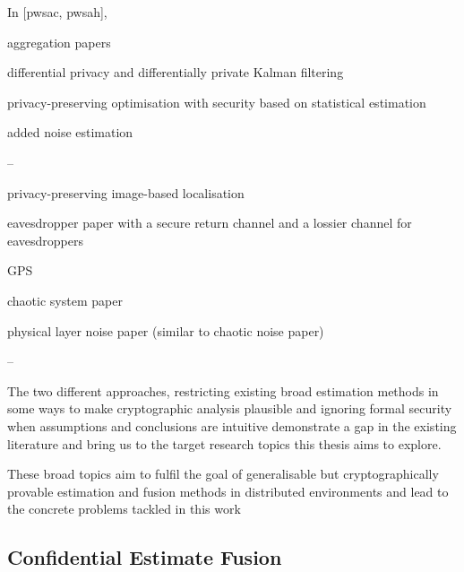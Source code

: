 In [pwsac, pwsah], 



aggregation papers

differential privacy and differentially private Kalman filtering

privacy-preserving optimisation with security based on statistical estimation

added noise estimation

--

privacy-preserving image-based localisation

eavesdropper paper with a secure return channel and a lossier channel for eavesdroppers

GPS

chaotic system paper

physical layer noise paper (similar to chaotic noise paper)

--


The two different approaches, restricting existing broad estimation methods in some ways to make cryptographic analysis plausible and ignoring formal security when assumptions and conclusions are intuitive demonstrate a gap in the existing literature and bring us to the target research topics this thesis aims to explore.

These broad topics aim to fulfil the goal of generalisable but cryptographically provable estimation and fusion methods in distributed environments and lead to the concrete problems tackled in this work

% 
% 

\subsection{Confidential Estimate Fusion}\label{subsec:intro:conf_est_fusion}

% 
% 

